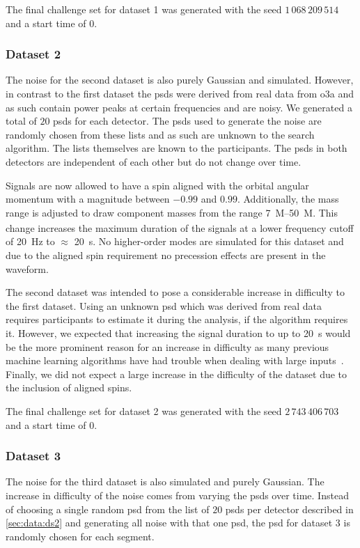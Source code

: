 The final challenge set for dataset 1 was generated with the seed $1\,068\,209\,514$ and a start time of $0$.

\subsubsection{Dataset 2}\label{sec:data:ds2}
The noise for the second dataset is also purely Gaussian and simulated. However, in contrast to the first dataset the \acrshort{psd}s were derived from real data from \acrshort{o3a} and as such contain power peaks at certain frequencies and are noisy. We generated a total of $20$ \acrshort{psd}s for each detector. The \acrshort{psd}s used to generate the noise are randomly chosen from these lists and as such are unknown to the search algorithm. The lists themselves are known to the participants. The \acrshort{psd}s in both detectors are independent of each other but do not change over time.

Signals are now allowed to have a spin aligned with the orbital angular momentum with a magnitude between $-0.99$ and $0.99$. Additionally, the mass range is adjusted to draw component masses from the range \SIrange{7}{50}{M_\odot}. This change increases the maximum duration of the signals at a lower frequency cutoff of \SI{20}{\hertz} to $\approx$ \SI{20}{\second}. No higher-order modes are simulated for this dataset and due to the aligned spin requirement no precession effects are present in the waveform.

The second dataset was intended to pose a considerable increase in difficulty to the first dataset. Using an unknown \acrshort{psd} which was derived from real data requires participants to estimate it during the analysis, if the algorithm requires it. However, we expected that increasing the signal duration to up to \SI{20}{\second} would be the more prominent reason for an increase in difficulty as many previous machine learning algorithms have had trouble when dealing with large inputs~\cite{Dreissigacker:2020xfr, Schafer:2020kor, Gabbard:2019rde, Goodfellow:2016:DNN}. Finally, we did not expect a large increase in the difficulty of the dataset due to the inclusion of aligned spins.

The final challenge set for dataset 2 was generated with the seed $2\,743\,406\,703$ and a start time of $0$.

\subsubsection{Dataset 3}
The noise for the third dataset is also simulated and purely Gaussian. The increase in difficulty of the noise comes from varying the \acrshort{psd}s over time. Instead of choosing a single random \acrshort{psd} from the list of $20$ \acrshort{psd}s per detector described in \autoref{sec:data:ds2} and generating all noise with that one \acrshort{psd}, the \acrshort{psd} for dataset 3 is randomly chosen for each segment. 

